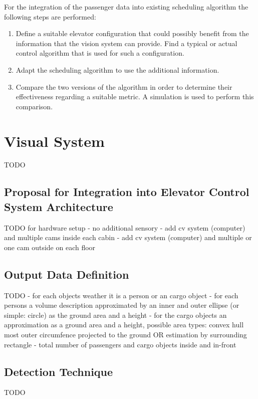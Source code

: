 For the integration of the  passenger data into existing scheduling algorithm the following steps are performed:

\begin{enumerate}
    \item Define a suitable elevator configuration that could possibly benefit from the information that the vision system can provide. 
    Find a typical or actual control algorithm that is used for such a configuration.
    \item Adapt the scheduling algorithm to use the additional information.
    \item Compare the two versions of the algorithm in order to determine their effectiveness regarding a suitable metric.
    A simulation is used to perform this comparison.
\end{enumerate}

 
\section{Visual System}
TODO
\subsection{Proposal for Integration into Elevator Control System Architecture}
TODO
for hardware setup
- no additional sensory
- add cv system (computer) and multiple cams inside each cabin
- add cv system (computer) and multiple or one cam outside on each floor
\subsection{Output Data Definition}
TODO
- for each objects weather it is a person or an cargo object
- for each persons a volume description approximated by an inner and outer ellipse (or simple: circle) as the ground area and a height
- for the cargo objects an approximation as a ground area and a height, possible area types: convex hull most outer circumfence projected to the ground OR estimation by surrounding rectangle
- total number of passengers and cargo objects inside and in-front
\subsection{Detection Technique}
TODO
